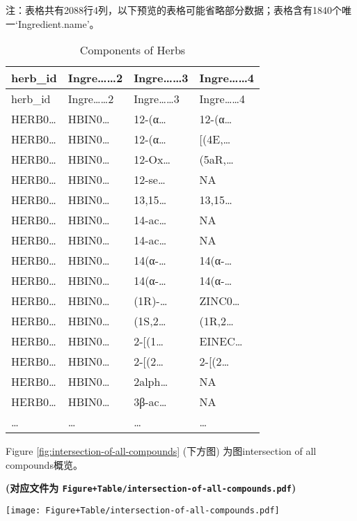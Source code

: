 \documentclass[
]{article}
\begin{document}
\begin{center}\begin{tcolorbox}[colback=gray!10, colframe=gray!50, width=0.9\linewidth, arc=1mm, boxrule=0.5pt]注：表格共有2088行4列，以下预览的表格可能省略部分数据；表格含有1840个唯一`Ingredient.name'。
\end{tcolorbox}
\end{center}

\begin{longtable}[]{@{}llll@{}}
\caption{\label{tab:Components-of-Herbs}Components of Herbs}\tabularnewline
\toprule
herb\_id & Ingre\ldots\ldots2 & Ingre\ldots\ldots3 & Ingre\ldots\ldots4\tabularnewline
\midrule
\endfirsthead
\toprule
herb\_id & Ingre\ldots\ldots2 & Ingre\ldots\ldots3 & Ingre\ldots\ldots4\tabularnewline
\midrule
\endhead
HERB0\ldots{} & HBIN0\ldots{} & 12-(α\ldots{} & 12-(α\ldots{}\tabularnewline
HERB0\ldots{} & HBIN0\ldots{} & 12-(α\ldots{} & {[}(4E,\ldots{}\tabularnewline
HERB0\ldots{} & HBIN0\ldots{} & 12-Ox\ldots{} & (5aR,\ldots{}\tabularnewline
HERB0\ldots{} & HBIN0\ldots{} & 12-se\ldots{} & NA\tabularnewline
HERB0\ldots{} & HBIN0\ldots{} & 13,15\ldots{} & 13,15\ldots{}\tabularnewline
HERB0\ldots{} & HBIN0\ldots{} & 14-ac\ldots{} & NA\tabularnewline
HERB0\ldots{} & HBIN0\ldots{} & 14-ac\ldots{} & NA\tabularnewline
HERB0\ldots{} & HBIN0\ldots{} & 14(α-\ldots{} & 14(α-\ldots{}\tabularnewline
HERB0\ldots{} & HBIN0\ldots{} & 14(α-\ldots{} & 14(α-\ldots{}\tabularnewline
HERB0\ldots{} & HBIN0\ldots{} & (1R)-\ldots{} & ZINC0\ldots{}\tabularnewline
HERB0\ldots{} & HBIN0\ldots{} & (1S,2\ldots{} & (1R,2\ldots{}\tabularnewline
HERB0\ldots{} & HBIN0\ldots{} & 2-{[}(1\ldots{} & EINEC\ldots{}\tabularnewline
HERB0\ldots{} & HBIN0\ldots{} & 2-{[}(2\ldots{} & 2-{[}(2\ldots{}\tabularnewline
HERB0\ldots{} & HBIN0\ldots{} & 2alph\ldots{} & NA\tabularnewline
HERB0\ldots{} & HBIN0\ldots{} & 3β-ac\ldots{} & NA\tabularnewline
\ldots{} & \ldots{} & \ldots{} & \ldots{}\tabularnewline
\bottomrule
\end{longtable}

Figure \ref{fig:intersection-of-all-compounds} (下方图) 为图intersection of all compounds概览。

\textbf{(对应文件为 \texttt{Figure+Table/intersection-of-all-compounds.pdf})}

\def\@captype{figure}
\begin{center}
\texttt{[image: Figure+Table/intersection-of-all-compounds.pdf]}
\caption{Intersection of all compounds}\label{fig:intersection-of-all-compounds}
\end{center}
\end{document}
